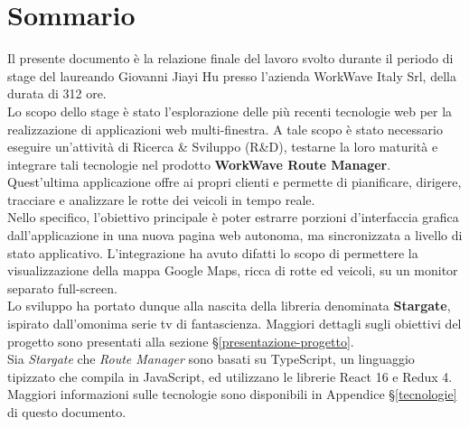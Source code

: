 
\cleardoublepage
{}
{}
\begingroup

\chapter*{Sommario}

Il presente documento è la relazione finale del lavoro svolto durante il periodo di stage del laureando Giovanni Jiayi Hu presso l'azienda WorkWave Italy Srl, della durata di 312 ore. \\

Lo scopo dello stage è stato l'esplorazione delle più recenti tecnologie web per la realizzazione di applicazioni web multi-finestra. A tale scopo è stato necessario eseguire un'attività di Ricerca \& Sviluppo (R\&D), testarne la loro maturità e integrare tali tecnologie nel prodotto \textbf{WorkWave Route Manager}. Quest'ultima applicazione offre ai propri clienti e permette di pianificare, dirigere, tracciare e analizzare le rotte dei  veicoli in tempo reale. \\

Nello specifico, l'obiettivo principale è poter estrarre porzioni d'interfaccia grafica dall'applicazione in una nuova pagina web autonoma, ma sincronizzata a livello di stato applicativo. L'integrazione ha avuto difatti lo scopo di permettere la visualizzazione della mappa Google Maps, ricca di rotte ed veicoli, su un monitor separato full-screen. \\

Lo sviluppo ha portato dunque alla nascita della libreria denominata \textbf{Stargate}, ispirato dall'omonima serie tv di fantascienza. Maggiori dettagli sugli obiettivi del progetto sono presentati alla sezione §\ref{presentazione-progetto}. \\

Sia \textit{Stargate} che \textit{Route Manager} sono basati su TypeScript, un linguaggio tipizzato che compila in JavaScript, ed utilizzano le librerie React 16 e Redux 4. Maggiori informazioni sulle tecnologie sono disponibili in Appendice §\ref{tecnologie} di questo documento.

%
%

\endgroup			

\vfill

